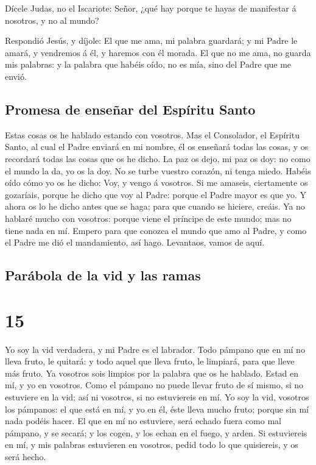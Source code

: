  Dícele Judas, no el Iscariote: Señor, ¿qué hay porque te
hayas de manifestar á nosotros, y no al mundo?

 Respondió Jesús, y díjole: El que me ama, mi palabra
guardará; y mi Padre le amará, y vendremos á él, y haremos con él
morada.  El que no me ama, no guarda mis palabras: y la
palabra que habéis oído, no es mía, sino del Padre que me envió.

\hypertarget{promesa-de-enseuxf1ar-del-espuxedritu-santo}{%
\subsection{Promesa de enseñar del Espíritu
Santo}\label{promesa-de-enseuxf1ar-del-espuxedritu-santo}}

 Estas cosas os he hablado estando con vosotros.
 Mas el Consolador, el Espíritu Santo, al cual el Padre
enviará en mi nombre, él os enseñará todas las cosas, y os recordará
todas las cosas que os he dicho.  La paz os dejo, mi paz
os doy: no como el mundo la da, yo os la doy. No se turbe vuestro
corazón, ni tenga miedo.  Habéis oído cómo yo os he
dicho: Voy, y vengo á vosotros. Si me amaseis, ciertamente os gozaríais,
porque he dicho que voy al Padre: porque el Padre mayor es que yo.
 Y ahora os lo he dicho antes que se haga; para que
cuando se hiciere, creáis.  Ya no hablaré mucho con
vosotros: porque viene el príncipe de este mundo; mas no tiene nada en
mí.  Empero para que conozca el mundo que amo al Padre, y
como el Padre me dió el mandamiento, así hago. Levantaos, vamos de aquí.

\hypertarget{paruxe1bola-de-la-vid-y-las-ramas}{%
\subsection{Parábola de la vid y las
ramas}\label{paruxe1bola-de-la-vid-y-las-ramas}}

\hypertarget{section-14}{%
\section{15}\label{section-14}}

 Yo soy la vid verdadera, y mi Padre es el labrador.
 Todo pámpano que en mí no lleva fruto, le quitará: y todo
aquel que lleva fruto, le limpiará, para que lleve más fruto.
 Ya vosotros sois limpios por la palabra que os he
hablado.  Estad en mí, y yo en vosotros. Como el pámpano
no puede llevar fruto de sí mismo, si no estuviere en la vid; así ni
vosotros, si no estuviereis en mí.  Yo soy la vid,
vosotros los pámpanos: el que está en mí, y yo en él, éste lleva mucho
fruto; porque sin mí nada podéis hacer.  El que en mí no
estuviere, será echado fuera como mal pámpano, y se secará; y los cogen,
y los echan en el fuego, y arden.  Si estuviereis en mí, y
mis palabras estuvieren en vosotros, pedid todo lo que quisiereis, y os
será hecho.

